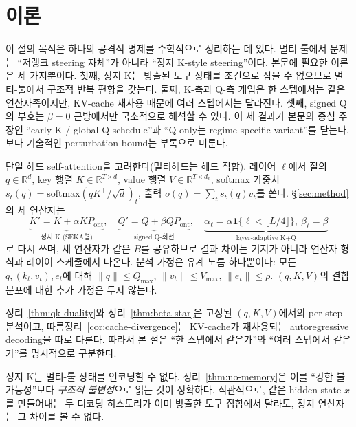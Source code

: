 \section{이론}\label{sec:theory}

이 절의 목적은 하나의 공격적 명제를 수학적으로 정리하는 데 있다. 멀티-툴에서 문제는 ``저랭크 steering 자체''가 아니라 ``정지 K-style steering''이다. 본문에 필요한 이론은 세 가지뿐이다. 첫째, 정지 K는 방출된 도구 상태를 조건으로 삼을 수 없으므로 멀티-툴에서 구조적 반복 편향을 갖는다. 둘째, K-측과 Q-측 개입은 한 스텝에서는 같은 연산자족이지만, KV-cache 재사용 때문에 여러 스텝에서는 달라진다. 셋째, signed Q의 부호는 $\beta=0$ 근방에서만 국소적으로 해석할 수 있다. 이 세 결과가 본문의 중심 주장인 ``early-K / global-Q schedule''과 ``Q-only는 regime-specific variant''를 닫는다. 보다 기술적인 perturbation bound는 부록으로 미룬다.

단일 헤드 self-attention을 고려한다(멀티헤드는 헤드 직합). 레이어 $\ell$에서 질의 $q \in \mathbb{R}^d$, key 행렬 $K \in \mathbb{R}^{T\times d}$, value 행렬 $V \in \mathbb{R}^{T\times d_v}$, softmax 가중치 $s_t(q) = \mathrm{softmax}(qK^\top/\sqrt d)_t$, 출력 $o(q) = \sum_t s_t(q) v_t$를 쓴다. \S\ref{sec:method}의 세 연산자는
\begin{equation}\label{eq:ops}
\underbrace{K' = K + \alpha K P_{\mathrm{ont}}}_{\text{정지 K (SEKA형)}},\quad
\underbrace{Q' = Q + \beta Q P_{\mathrm{ont}}}_{\text{signed Q-회전}},\quad
\underbrace{\alpha_\ell = \alpha \mathbf{1}\{\ell < \lfloor L/4\rfloor\},\ \beta_\ell = \beta}_{\text{layer-adaptive K+Q}}
\end{equation}
로 다시 쓰며, 세 연산자가 같은 $B$를 공유하므로 결과 차이는 기저가 아니라 연산자 형식과 레이어 스케줄에서 나온다. 분석 가정은 유계 노름 하나뿐이다: 모든 $q, (k_t, v_t), e_t$에 대해 $\|q\|\le Q_{\max}$, $\|v_t\|\le V_{\max}$, $\|e_t\|\le\rho$. $(q, K, V)$의 결합 분포에 대한 추가 가정은 두지 않는다.

\begin{assumption}[분석 범위]\label{ass:scope}
정리~\ref{thm:qk-duality}와 정리~\ref{thm:beta-star}은 고정된 $(q,K,V)$에서의 per-step 분석이고, 따름정리~\ref{cor:cache-divergence}는 KV-cache가 재사용되는 autoregressive decoding을 따로 다룬다. 따라서 본 절은 ``한 스텝에서 같은가''와 ``여러 스텝에서 같은가''를 명시적으로 구분한다.
\end{assumption}

정지 K는 멀티-툴 상태를 인코딩할 수 없다. 정리~\ref{thm:no-memory}은 이를 ``강한 불가능성''보다 \emph{구조적 불변성}으로 읽는 것이 정확하다. 직관적으로, 같은 hidden state $x$를 만들어내는 두 디코딩 히스토리가 이미 방출한 도구 집합에서 달라도, 정지 연산자는 그 차이를 볼 수 없다.

